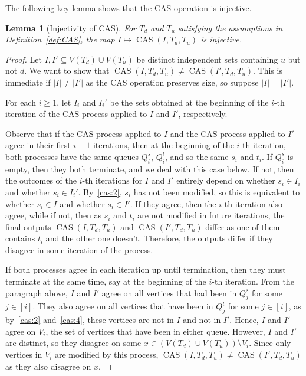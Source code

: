 \documentclass[11pt]{article}
\newtheorem{lemma}[theorem]{Lemma}
\theoremstyle{definition}
\DeclareMathOperator{\cas}{CAS}
\begin{document}
The following key lemma shows that the CAS operation is injective.
\begin{lemma}[Injectivity of CAS]\label{lem:injcas}
For $T_d$ and $T_u$ satisfying the assumptions in Definition~\ref{def:CAS}, the map $I\mapsto\cas(I,T_d,T_u)$ is injective. 
\end{lemma}
\begin{proof}
Let $I,I'\subseteq V(T_d)\cup V(T_u)$ be distinct independent sets containing $u$ but not $d$. We want to show that $\cas(I,T_d,T_u)\not=\cas(I',T_d,T_u)$. This is immediate if $|I|\not=|I'|$ as the CAS operation preserves size, so suppose $|I|=|I'|$. 

For each $i\geq 1$, let $I_i$ and $I_i'$ be the sets obtained at the beginning of the $i$-th iteration of the CAS process applied to $I$ and $I'$, respectively. 

Observe that if the CAS process applied to $I$ and the CAS process applied to $I'$ agree in their first $i-1$ iterations, then at the beginning of the $i$-th iteration, both processes have the same queues $Q_i^s$, $Q_i^t$, and so the same $s_i$ and $t_i$. If $Q_i^s$ is empty, then they both terminate, and we deal with this case below. If not, then the outcomes of the $i$-th iterations for $I$ and $I'$ entirely depend on whether $s_i\in I_i$ and whether $s_i\in I_i'$. By~\ref{cas:2}, $s_i$ has not been modified, so this is equivalent to whether $s_i\in I$ and whether $s_i\in I'$. If they agree, then the $i$-th iteration also agree, while if not, then as $s_i$ and $t_i$ are not modified in future iterations, the final outputs $\cas(I,T_d,T_u)$ and $\cas(I',T_d,T_u)$ differ as one of them contains $t_i$ and the other one doesn't. Therefore, the outputs differ if they disagree in some iteration of the process.

If both processes agree in each iteration up until termination, then they must terminate at the same time, say at the beginning of the $i$-th iteration. From the paragraph above, $I$ and $I'$ agree on all vertices that had been in $Q_j^s$ for some $j\in[i]$. They also agree on all vertices that have been in $Q_j^t$ for some $j\in[i]$, as by~\ref{cas:2} and~\ref{cas:4}, these vertices are not in $I$ and not in $I'$. Hence, $I$ and $I'$ agree on $V_i$, the set of vertices that have been in either queue. However, $I$ and $I'$ are distinct, so they disagree on some $x\in(V(T_d)\cup V(T_u))\setminus V_i$. Since only vertices in $V_i$ are modified by this process, $\cas(I,T_d,T_u)\not=\cas(I',T_d,T_u)$ as they also disagree on $x$.
\end{proof}
\end{document}
